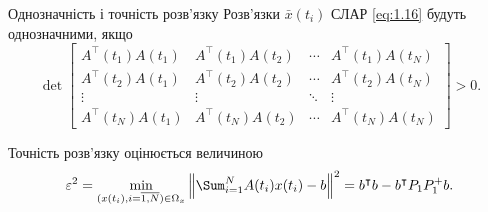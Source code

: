\begin{mframe}{Однозначність і точність розв'язку}
    Розв'язки $\bar x(t_i)$ СЛАР \eqref{eq:1.16} будуть однозначними, якщо
    \begin{equation}
        \label{eq:1.21}
        \det \begin{bmatrix}
            A^\intercal(t_1) A(t_1) & A^\intercal(t_1) A(t_2) & \cdots & 
                A^\intercal(t_1) A(t_N) \\
            A^\intercal(t_2) A(t_1) & A^\intercal(t_2) A(t_2) & \cdots & 
                A^\intercal(t_2) A(t_N) \\
            \vdots & \vdots & \ddots & \vdots \\
            A^\intercal(t_N) A(t_1) & A^\intercal(t_N) A(t_2) & \cdots & 
                A^\intercal(t_N) A(t_N)
        \end{bmatrix} > 0.
    \end{equation}

    Точність розв'язку оцінюється величиною
    \begin{equation}
        \label{eq:1.22}
        \varepsilon^2 = \min_{(x(t_i), i = \overline{1, N}) \in \Omega_x} 
        \left\| \Sum_{i = 1}^N A(t_i) x(t_i) - b \right\|^2 =
        b^\intercal b - b^\intercal P_1 P_1^+ b.
    \end{equation}
\end{mframe}
